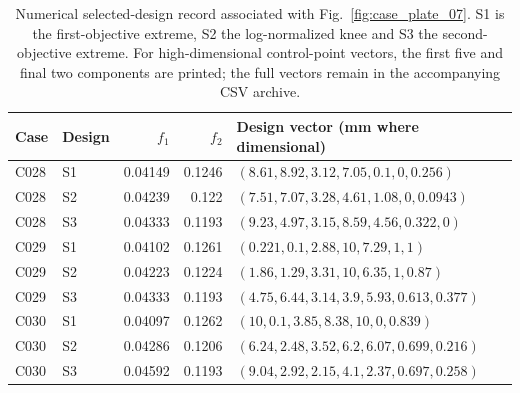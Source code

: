 \begin{table}[p]
\centering\scriptsize
\caption{Numerical selected-design record associated with Fig.~\ref{fig:case_plate_07}. S1 is the first-objective extreme, S2 the log-normalized knee and S3 the second-objective extreme. For high-dimensional control-point vectors, the first five and final two components are printed; the full vectors remain in the accompanying CSV archive.}
\label{tab:case_plate_07}
\setlength{\tabcolsep}{3.2pt}
\begin{tabularx}{\textwidth}{llrr>{\raggedright\arraybackslash}X}
\toprule Case & Design & $f_1$ & $f_2$ & Design vector (mm where dimensional) \\
\midrule
C028 & S1 & 0.04149 & 0.1246 & $(8.61, 8.92, 3.12, 7.05, 0.1, 0, 0.256)$ \\
C028 & S2 & 0.04239 & 0.122 & $(7.51, 7.07, 3.28, 4.61, 1.08, 0, 0.0943)$ \\
C028 & S3 & 0.04333 & 0.1193 & $(9.23, 4.97, 3.15, 8.59, 4.56, 0.322, 0)$ \\
C029 & S1 & 0.04102 & 0.1261 & $(0.221, 0.1, 2.88, 10, 7.29, 1, 1)$ \\
C029 & S2 & 0.04223 & 0.1224 & $(1.86, 1.29, 3.31, 10, 6.35, 1, 0.87)$ \\
C029 & S3 & 0.04333 & 0.1193 & $(4.75, 6.44, 3.14, 3.9, 5.93, 0.613, 0.377)$ \\
C030 & S1 & 0.04097 & 0.1262 & $(10, 0.1, 3.85, 8.38, 10, 0, 0.839)$ \\
C030 & S2 & 0.04286 & 0.1206 & $(6.24, 2.48, 3.52, 6.2, 6.07, 0.699, 0.216)$ \\
C030 & S3 & 0.04592 & 0.1193 & $(9.04, 2.92, 2.15, 4.1, 2.37, 0.697, 0.258)$ \\
\bottomrule
\end{tabularx}
\end{table}
